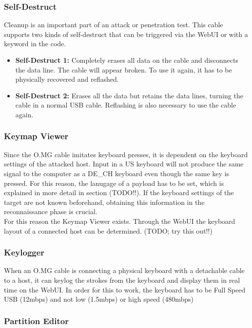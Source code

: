 \subsubsection{Self-Destruct}

Cleanup is an important part of an attack or penetration test. This cable supports two kinds of self-destruct that can be triggered via the WebUI or with a keyword in the code.
\begin{itemize}
    \item  \textbf{Self-Destruct 1:} Completely erases all data on the cable and disconnects the data line. The cable will appear broken. To use it again, it has to be physically recovered and reflashed.  
    \item  \textbf{Self-Destruct 2:}  Erases all the data but retains the data lines, turning the cable in a normal USB cable. Reflashing is also necessary to use the cable again. 
\end{itemize}


\subsubsection{Keymap Viewer}

Since the O.MG cable imitates keyboard presses, it is dependent on the keyboard settings of the attacked host. Input in a US keyboard will not produce the same signal to the computer as a DE\_CH keyboard even though the same key is pressed. For this reason, the lanugage of a payload has to be set, which is explained in more detail in section (TODO!!). If the keyboard settings of the target are not known beforehand, obtaining this information in the reconnaissance phase is crucial. \\
For this reason the Keymap Viewer exists. Through the WebUI the keyboard layout of a connected host can be determined. (TODO; try this out!!)

\subsubsection{Keylogger}

When an O.MG cable is connecting a physical keyboard with a detachable cable to a host, it can keylog the strokes from the keyboard and display them in real time on the WebUI. In order for this to work, the keyboard has to be Full Speed USB (12mbps) and not low (1.5mbps) or high speed (480mbps) 

\subsubsection{Partition Editor}

